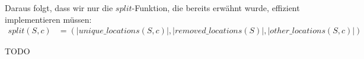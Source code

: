 \documentclass[a4paper,12pt]{llncs}
\numberwithin{equation}{section}
\begin{document}
Daraus folgt, dass wir nur die $split$-Funktion, die bereits erwähnt wurde, effizient implementieren müssen:
\begin{align}
split(S,c)&=(|unique\_locations(S, c)|, |removed\_locations(S)|, |other\_locations(S, c)|)
\nonumber
\end{align}

TODO


\newpage

 

\end{document}
